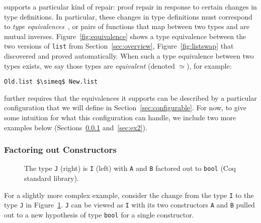 \toolname supports a particular kind of repair: proof repair in response to certain changes in type definitions.
In particular, these changes in type definitions must correspond to \textit{type equivalences}~\cite{univalent2013homotopy},
or pairs of functions that map between two types and are mutual inverses.
Figure~\ref{fig:equivalence} shows a type equivalence between the two versions of \lstinline{list}
from Section~\ref{sec:overview}, Figure~\ref{fig:listswap} that \toolname discovered and proved automatically.
When such a type equivalence between two types exists, we say those types are \textit{equivalent} (denoted $\simeq$), for example:

\begin{lstlisting}
Old.list $\simeq$ New.list
\end{lstlisting}
\toolname further requires that the equivalences it supports can be described by a particular configuration that we will define in Section~\ref{sec:configurable}. For now, to give some intuition for what this configuration can handle, we include two more examples below
(Sections~\ref{sec:ex1} and~\ref{sec:ex2}).

\subsubsection{Factoring out Constructors}
\label{sec:ex1}

\begin{figure}
\begin{minipage}{0.48\textwidth}

\end{minipage}
\hfill
\begin{minipage}{0.48\textwidth}

\end{minipage}
\vspace{-0.3cm}
\caption{The type \lstinline{J} (right) is \lstinline{I} (left) with \lstinline{A} and \lstinline{B} factored out to \lstinline{bool} (Coq standard library).}
\label{fig:equivalence2}
\end{figure}

For a slightly more complex example, consider the change from the type \lstinline{I} to the type \lstinline{J} in Figure~\ref{fig:equivalence2}.
\lstinline{J} can be viewed as \lstinline{I} with its two constructors \lstinline{A} and \lstinline{B} pulled out to a
new hypothesis of type \lstinline{bool} for a single constructor.

